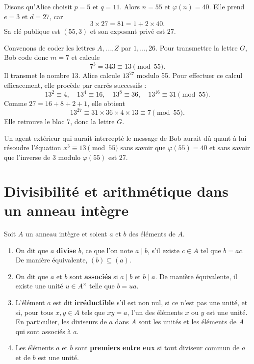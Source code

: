 \documentclass[]{report}
\begin{document}
\begin{ex}{}{}
    Disons qu'Alice choisit $p = 5$ et $q = 11$. Alors $n = 55$ et $\varphi(n) = 40$. Elle prend $e = 3$ et $d = 27$, car
    \[3 \times 27 = 81 = 1 + 2 \times 40.\]
    Sa clé publique est $(55, 3)$ et son exposant privé est $27$.

    Convenons de coder les lettres $A, \ldots, Z$ par $1, \ldots, 26$. Pour transmettre la lettre $G$, Bob code donc $m = 7$ et calcule
    \[7^3 = 343 \equiv 13 \pmod{55}.\]
    Il transmet le nombre 13. Alice calcule $13^{27}$ modulo 55. Pour effectuer ce calcul efficacement, elle procède par carrés successifs :
    \[13^2 \equiv 4, \quad 13^4 \equiv 16, \quad 13^8 \equiv 36, \quad 13^{16} \equiv 31 \pmod{55}.\]
    Comme $27 = 16 + 8 + 2 + 1$, elle obtient
    \[13^{27} \equiv 31 \times 36 \times 4 \times 13 \equiv 7 \pmod{55}.\]
    Elle retrouve le bloc 7, donc la lettre $G$.

    Un agent extérieur qui aurait intercepté le message de Bob aurait dû quant à lui résoudre l'équation $x^3 \equiv 13 \pmod{55}$ sans savoir que $\varphi(55) = 40$ et sans savoir que l'inverse de 3 modulo $\varphi(55)$ est 27.
\end{ex}

\section{Divisibilité et arithmétique dans un anneau intègre}

\begin{df}{}{}
    Soit $A$ un anneau intègre et soient $a$ et $b$ des éléments de $A$.
    \begin{enumerate}
        \item On dit que $a$ \textbf{divise} $b$, ce que l'on note $a \mid b$, s'il existe $c \in A$ tel que $b = ac$. De manière équivalente, $(b) \subseteq (a)$.
        \item On dit que $a$ et $b$ sont \textbf{associés} si $a \mid b$ et $b \mid a$. De manière équivalente, il existe une unité $u \in A^{\times}$ telle que $b = ua$.
        \item L'élément $a$ est dit \textbf{irréductible} s'il est non nul, si ce n'est pas une unité, et si, pour tous $x, y \in A$ tels que $xy = a$, l'un des éléments $x$ ou $y$ est une unité. En particulier, les diviseurs de $a$ dans $A$ sont les unités et les éléments de $A$ qui sont associés à $a$.
        \item Les éléments $a$ et $b$ sont \textbf{premiers entre eux} si tout diviseur commun de $a$ et de $b$ est une unité.
    \end{enumerate}
\end{df}
\end{document}
